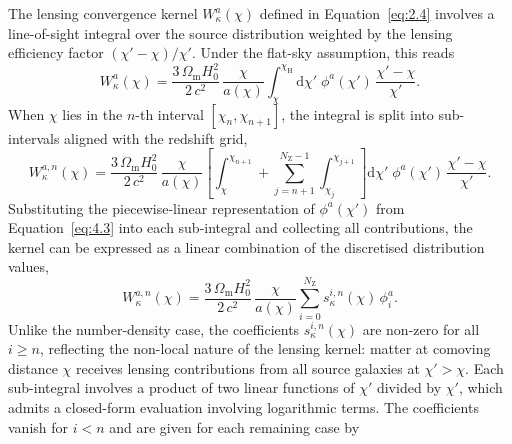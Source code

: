 The lensing convergence kernel \(W_\kappa^a(\chi)\) defined in Equation~\ref{eq:2.4} involves a line-of-sight integral over the source distribution weighted by the lensing efficiency factor \((\chi' - \chi)/\chi'\). Under the flat-sky assumption, this reads
\begin{equation} \label{eq:4.6}
    W_\kappa^{a}(\chi) = \frac{3\,\Omega_{\mathrm{m}} H_0^2}{2\,c^2}\,\frac{\chi}{a(\chi)} \int_{\chi}^{\chi_{\mathrm{H}}} \mathrm{d}\chi'\;\phi^{a}(\chi')\,\frac{\chi' - \chi}{\chi'}.
\end{equation}
When \(\chi\) lies in the \(n\)-th interval \([\chi_n, \chi_{n+1}]\), the integral is split into sub-intervals aligned with the redshift grid,
\begin{equation} \label{eq:4.7}
    W_\kappa^{a,n}(\chi) = \frac{3\,\Omega_{\mathrm{m}} H_0^2}{2\,c^2}\,\frac{\chi}{a(\chi)} \left[\int_{\chi}^{\chi_{n+1}} + \sum_{j=n+1}^{N_\mathrm{Z}-1}\int_{\chi_j}^{\chi_{j+1}}\right] \mathrm{d}\chi'\;\phi^{a}(\chi')\,\frac{\chi' - \chi}{\chi'}.
\end{equation}
Substituting the piecewise-linear representation of \(\phi^{a}(\chi')\) from Equation~\ref{eq:4.3} into each sub-integral and collecting all contributions, the kernel can be expressed as a linear combination of the discretised distribution values,
\begin{equation} \label{eq:4.8}
    W_\kappa^{a,n}(\chi) = \frac{3\,\Omega_{\mathrm{m}} H_0^2}{2\,c^2}\,\frac{\chi}{a(\chi)}\sum_{i=0}^{N_\mathrm{Z}} s_\kappa^{i,n}(\chi)\,\phi^{a}_{i}.
\end{equation}
Unlike the number-density case, the coefficients \(s_\kappa^{i,n}(\chi)\) are non-zero for all \(i \ge n\), reflecting the non-local nature of the lensing kernel: matter at comoving distance \(\chi\) receives lensing contributions from all source galaxies at \(\chi' > \chi\). Each sub-integral involves a product of two linear functions of \(\chi'\) divided by \(\chi'\), which admits a closed-form evaluation involving logarithmic terms. The coefficients vanish for \(i < n\) and are given for each remaining case by
